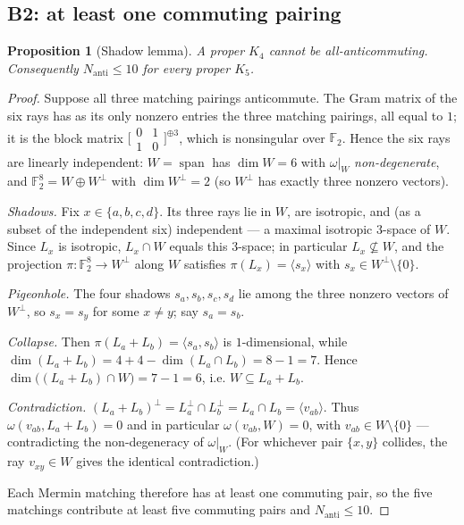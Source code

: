 \documentclass[11pt,a4paper]{article}
\newtheorem{proposition}[theorem]{Proposition}
\theoremstyle{remark}
\begin{document}
\subsection{B2: at least one commuting pairing}

\begin{proposition}[Shadow lemma]\label{prop:b2}
A proper $K_4$ cannot be all-anticommuting. Consequently $N_{\mathrm{anti}}\leq 10$
for every proper $K_5$.
\end{proposition}

\begin{proof}
Suppose all three matching pairings anticommute. The Gram matrix of the six rays
has as its only nonzero entries the three matching pairings, all equal to $1$; it
is the block matrix
$\bigl[\begin{smallmatrix}0&1\\1&0\end{smallmatrix}\bigr]^{\oplus 3}$,
which is nonsingular over $\mathbb{F}_2$. Hence the six rays are linearly
independent: $W=\operatorname{span}$ has $\dim W=6$ with $\omega|_W$
\emph{non-degenerate}, and $\mathbb{F}_2^8=W\oplus W^\perp$ with $\dim W^\perp=2$
(so $W^\perp$ has exactly three nonzero vectors).

\emph{Shadows.} Fix $x\in\{a,b,c,d\}$. Its three rays lie in $W$, are isotropic,
and (as a subset of the independent six) independent — a maximal isotropic
$3$-space of $W$. Since $L_x$ is isotropic, $L_x\cap W$ equals this $3$-space; in
particular $L_x\not\subseteq W$, and the projection $\pi\colon\mathbb{F}_2^8\to
W^\perp$ along $W$ satisfies $\pi(L_x)=\langle s_x\rangle$ with
$s_x\in W^\perp\setminus\{0\}$.

\emph{Pigeonhole.} The four shadows $s_a,s_b,s_c,s_d$ lie among the three nonzero
vectors of $W^\perp$, so $s_x=s_y$ for some $x\neq y$; say $s_a=s_b$.

\emph{Collapse.} Then $\pi(L_a+L_b)=\langle s_a,s_b\rangle$ is $1$-dimensional,
while $\dim(L_a+L_b)=4+4-\dim(L_a\cap L_b)=8-1=7$. Hence
$\dim\bigl((L_a+L_b)\cap W\bigr)=7-1=6$, i.e. $W\subseteq L_a+L_b$.

\emph{Contradiction.} $(L_a+L_b)^\perp=L_a^\perp\cap L_b^\perp=L_a\cap
L_b=\langle v_{ab}\rangle$. Thus $\omega(v_{ab},L_a+L_b)=0$ and in particular
$\omega(v_{ab},W)=0$, with $v_{ab}\in W\setminus\{0\}$ — contradicting the
non-degeneracy of $\omega|_W$. (For whichever pair $\{x,y\}$ collides, the ray
$v_{xy}\in W$ gives the identical contradiction.)

Each Mermin matching therefore has at least one commuting pair, so the five
matchings contribute at least five commuting pairs and $N_{\mathrm{anti}}\leq 10$.
\end{proof}
\end{document}
